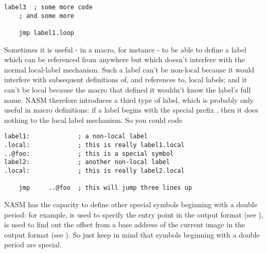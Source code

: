 \begin{lstlisting}
label3  ; some more code
    ; and some more

    jmp label1.loop
\end{lstlisting}

Sometimes it is useful - in a macro, for instance - to be able to
define a label which can be referenced from anywhere but which
doesn't interfere with the normal local-label mechanism. Such a
label can't be non-local because it would interfere with subsequent
definitions of, and references to, local labels; and it can't be
local because the macro that defined it wouldn't know the label's
full name. NASM therefore introduces a third type of label, which is
probably only useful in macro definitions: if a label begins with
the special prefix , then it
does nothing to the local label mechanism. So you could code

\begin{lstlisting}
label1:             ; a non-local label
.local:             ; this is really label1.local
..@foo:             ; this is a special symbol
label2:             ; another non-local label
.local:             ; this is really label2.local

    jmp     ..@foo  ; this will jump three lines up
\end{lstlisting}

NASM has the capacity to define other special symbols beginning with
a double period: for example,  is used to specify the
entry point in the  output format (see ),
 is used to find out the offset from a base address
of the current image in the  output format
(see ). So just keep in mind that symbols
beginning with a double period are special.
